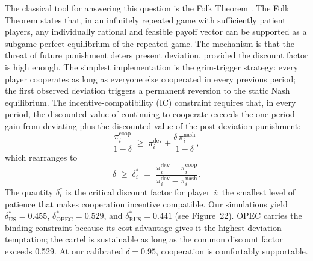 The classical tool for answering this question is the Folk Theorem
\citep{friedman1971,fudenbergmaskin1986}. The Folk Theorem states that,
in an infinitely repeated game with sufficiently patient players, any
individually rational and feasible payoff vector can be supported as a
subgame-perfect equilibrium of the repeated game. The mechanism is that
the threat of future punishment deters present deviation, provided the
discount factor is high enough. The simplest implementation is the
grim-trigger strategy: every player cooperates as long as everyone else
cooperated in every previous period; the first observed deviation
triggers a permanent reversion to the static Nash equilibrium. The
incentive-compatibility (IC) constraint requires that, in every period,
the discounted value of continuing to cooperate exceeds the one-period
gain from deviating plus the discounted value of the post-deviation
punishment:
\begin{equation}
\frac{\pi_i^{\text{coop}}}{1 - \delta} \;\ge\; \pi_i^{\text{dev}} + \frac{\delta\, \pi_i^{\text{nash}}}{1 - \delta},
\label{eq:4}
\end{equation}
which rearranges to
\begin{equation}
\delta \;\ge\; \delta_i^* \;=\; \frac{\pi_i^{\text{dev}} - \pi_i^{\text{coop}}}{\pi_i^{\text{dev}} - \pi_i^{\text{nash}}}.
\label{eq:5}
\end{equation}
The quantity $\delta_i^*$ is the critical discount factor for player~$i$:
the smallest level of patience that makes cooperation incentive
compatible. Our simulations yield $\delta_{\text{US}}^* = 0.455$,
$\delta_{\text{OPEC}}^* = 0.529$, and $\delta_{\text{RUS}}^* = 0.441$
(see Figure~22). OPEC carries the binding constraint because its cost
advantage gives it the highest deviation temptation; the cartel is
sustainable as long as the common discount factor exceeds 0.529. At our
calibrated $\delta = 0.95$, cooperation is comfortably supportable.

